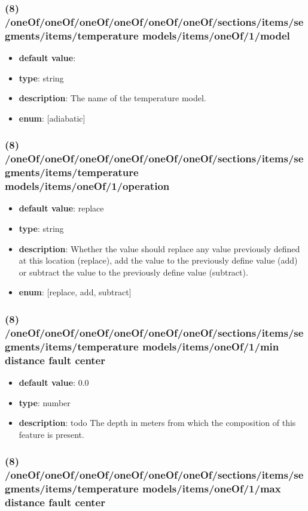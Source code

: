 \subsubsection{(8) /oneOf/oneOf/oneOf/oneOf/oneOf/oneOf/sections/items/segments/items/temperature models/items/oneOf/1/model}
\begin{itemize}[leftmargin=8em]\item {\bf default value}: 
\item {\bf type}: string
\item {\bf description}: The name of the temperature model.
\item {\bf enum}: [adiabatic]\end{itemize}\subsubsection{(8) /oneOf/oneOf/oneOf/oneOf/oneOf/oneOf/sections/items/segments/items/temperature models/items/oneOf/1/operation}
\begin{itemize}[leftmargin=8em]\item {\bf default value}: replace
\item {\bf type}: string
\item {\bf description}: Whether the value should replace any value previously defined at this location (replace), add the value to the previously define value (add) or subtract the value to the previously define value (subtract).
\item {\bf enum}: [replace, add, subtract]\end{itemize}\subsubsection{(8) /oneOf/oneOf/oneOf/oneOf/oneOf/oneOf/sections/items/segments/items/temperature models/items/oneOf/1/min distance fault center}
\begin{itemize}[leftmargin=8em]\item {\bf default value}: 0.0
\item {\bf type}: number
\item {\bf description}: todo The depth in meters from which the composition of this feature is present.
\end{itemize}\subsubsection{(8) /oneOf/oneOf/oneOf/oneOf/oneOf/oneOf/sections/items/segments/items/temperature models/items/oneOf/1/max distance fault center}
